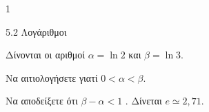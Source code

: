\begin{ylh}{1}
\item 5.2 Λογάριθμοι
\end{ylh}
Δίνονται οι αριθμοί $\alpha = \ln 2$ και $\beta = \ln 3$.
\begin{alist}
\item Να αιτιολογήσετε γιατί $0 < \alpha < \beta$.
\item Να αποδείξετε ότι $\beta - \alpha < 1$ .
Δίνεται $e \simeq 2{,}71$.
\end{alist}

